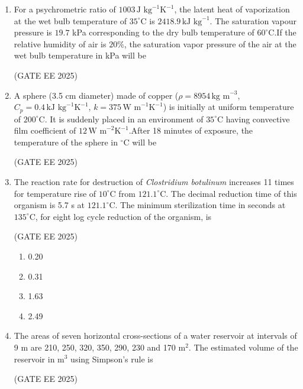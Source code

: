 \documentclass[journal,12pt,onecolumn]{IEEEtran}
\theoremstyle{remark}
\begin{document}
\begin{enumerate}
\item For a psychrometric ratio of $1003 \,\text{J kg}^{-1}\text{K}^{-1}$, the latent heat of vaporization at the wet bulb temperature of $35^\circ$C is $2418.9 \,\text{kJ kg}^{-1}$. The saturation vapour pressure is $19.7$ kPa corresponding to the dry bulb temperature of $60^\circ$C.If the relative humidity of air is $20\%$, the saturation vapor pressure of the air at the wet bulb temperature in kPa will be \underline{\hspace{2cm}}

\hfill(GATE EE 2025)

\item A sphere (3.5 cm diameter) made of copper ($\rho = 8954 \,\text{kg m}^{-3}$, $C_p = 0.4 \,\text{kJ kg}^{-1}\text{K}^{-1}$, $k = 375 \,\text{W m}^{-1}\text{K}^{-1}$) is initially at uniform temperature of $200^\circ$C. It is suddenly placed in an environment of $35^\circ$C having convective film coefficient of $12 \,\text{W m}^{-2}\text{K}^{-1}$.After 18 minutes of exposure, the temperature of the sphere in $^\circ$C will be \underline{\hspace{2cm}}

\hfill(GATE EE 2025)

\item The reaction rate for destruction of \textit{Clostridium botulinum} increases 11 times for temperature rise of $10^\circ$C from $121.1^\circ$C. The decimal reduction time of this organism is 5.7 s at $121.1^\circ$C. The minimum sterilization time in seconds at $135^\circ$C, for eight log cycle reduction of the organism, is  

\hfill(GATE EE 2025)

\begin{multicols}{4}
\begin{enumerate}
\item 0.20
\item 0.31
\item 1.63
\item 2.49
\end{enumerate}
\end{multicols}

\item The areas of seven horizontal cross-sections of a water reservoir at intervals of 9 m are 210, 250, 320, 350, 290, 230 and 170 m$^2$. The estimated volume of the reservoir in m$^3$ using Simpson's rule is\underline{\hspace{2cm}}

\hfill(GATE EE 2025)


\end{enumerate}
\end{document}
